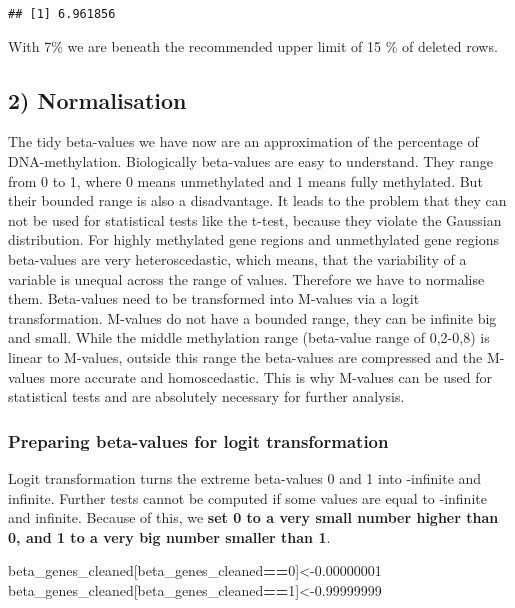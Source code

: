 \documentclass[]{article}
\newenvironment{Shaded}{\begin{snugshade}}{\end{snugshade}}
\newcommand{\DecValTok}[1]{\textcolor[rgb]{0.00,0.00,0.81}{#1}}
\newcommand{\FloatTok}[1]{\textcolor[rgb]{0.00,0.00,0.81}{#1}}
\newcommand{\OperatorTok}[1]{\textcolor[rgb]{0.81,0.36,0.00}{\textbf{#1}}}
\newcommand{\NormalTok}[1]{#1}
\begin{document}
\begin{verbatim}
## [1] 6.961856
\end{verbatim}

With 7\% we are beneath the recommended upper limit of 15 \% of deleted
rows.

\subsection{2) Normalisation}\label{normalisation}

The tidy beta-values we have now are an approximation of the percentage
of DNA-methylation. Biologically beta-values are easy to understand.
They range from 0 to 1, where 0 means unmethylated and 1 means fully
methylated. But their bounded range is also a disadvantage. It leads to
the problem that they can not be used for statistical tests like the
t-test, because they violate the Gaussian distribution. For highly
methylated gene regions and unmethylated gene regions beta-values are
very heteroscedastic, which means, that the variability of a variable is
unequal across the range of values. Therefore we have to normalise them.
Beta-values need to be transformed into M-values via a logit
transformation. M-values do not have a bounded range, they can be
infinite big and small. While the middle methylation range (beta-value
range of 0,2-0,8) is linear to M-values, outside this range the
beta-values are compressed and the M-values more accurate and
homoscedastic. This is why M-values can be used for statistical tests
and are absolutely necessary for further analysis.

\subsubsection{Preparing beta-values for logit
transformation}\label{preparing-beta-values-for-logit-transformation}

Logit transformation turns the extreme beta-values 0 and 1 into
-infinite and infinite. Further tests cannot be computed if some values
are equal to -infinite and infinite. Because of this, we \textbf{set 0
to a very small number higher than 0, and 1 to a very big number smaller
than 1}.

\begin{Shaded}
\begin{Highlighting}[]
\NormalTok{beta_genes_cleaned[beta_genes_cleaned}\OperatorTok{==}\DecValTok{0}\NormalTok{]<-}\FloatTok{0.00000001}
\NormalTok{beta_genes_cleaned[beta_genes_cleaned}\OperatorTok{==}\DecValTok{1}\NormalTok{]<-}\FloatTok{0.99999999}
\end{Highlighting}
\end{Shaded}
\end{document}
